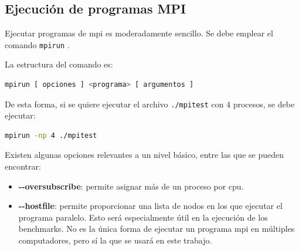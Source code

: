 \subsection{Ejecución de programas MPI}
\label{sssec:ejecucion_mpi}
Ejecutar programas de \acrshort{mpi} es moderadamente sencillo. Se debe emplear el comando \texttt{mpirun} \cite{mpi_mpirun}.

La estructura del comando es:
\begin{lstlisting}[language=bash]
mpirun [ opciones ] <programa> [ argumentos ]
\end{lstlisting}

De esta forma, si se quiere ejecutar el archivo \texttt{./mpitest} con 4 procesos, se debe ejecutar:
\begin{lstlisting}[language=bash]
mpirun -np 4 ./mpitest
\end{lstlisting}


Existen algunas opciones relevantes a un nivel básico, entre las que se pueden encontrar:
\begin{itemize}
  \item\textbf{-{}-oversubscribe}: permite asignar más de un proceso por \acrshort{cpu}.
  \item\textbf{-{}-hostfile}: permite proporcionar una lista de nodos en los que ejecutar el programa paralelo. Esto será especialmente útil en la ejecución de los benchmarks. No es la única forma de ejecutar un programa \acrshort{mpi} en múltiples computadores, pero sí la que se usará en este trabajo.
\end{itemize}


